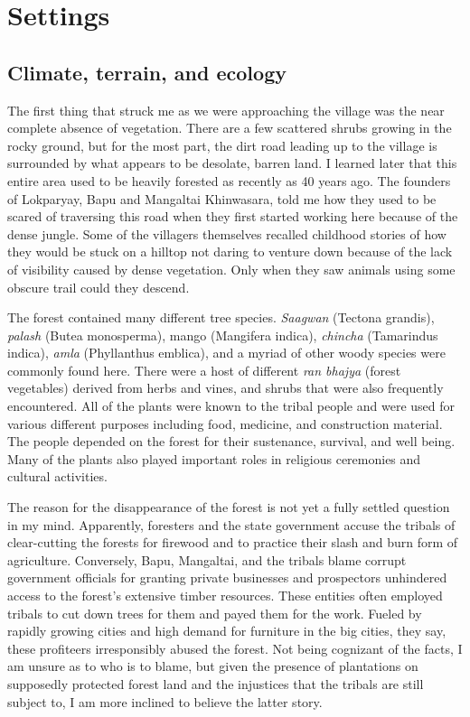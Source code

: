 \documentclass{report}
\begin{document}
\tableofcontents

\chapter{Settings}\label{ch:settings}
\section{Climate, terrain, and ecology}\label{sec:ecology}

The first thing that struck me as we were approaching the village was the near complete absence of vegetation. There are a few scattered shrubs growing in the rocky ground, but for the most part, the dirt road leading up to the village is surrounded by what appears to be desolate, barren land. I learned later that this entire area used to be heavily forested as recently as 40 years ago. The founders of Lokparyay, Bapu and Mangaltai Khinwasara, told me how they used to be scared of traversing this road when they first started working here because of the dense jungle. Some of the villagers themselves recalled childhood stories of how they would be stuck on a hilltop not daring to venture down because of the lack of visibility caused by dense vegetation. Only when they saw animals using some obscure trail could they descend.

The forest contained many different tree species. \textit{Saagwan} (Tectona grandis), \textit{palash} (Butea monosperma), mango (Mangifera indica), \textit{chincha} (Tamarin\-dus indica), \textit{amla} (Phyllanthus emblica), and a myriad of other woody species were commonly found here. There were a host of different \textit{ran bhajya} (forest vegetables) derived from herbs and vines, and shrubs that were also frequently encountered. All of the plants were known to the tribal people and were used for various different purposes including food, medicine, and construction material. The people depended on the forest for their sustenance, survival, and well being. Many of the plants also played important roles in religious ceremonies and cultural activities.

The reason for the disappearance of the forest is not yet a fully settled question in my mind. Apparently, foresters and the state government accuse the tribals of clear-cutting the forests for firewood and to practice their slash and burn form of agriculture. Conversely, Bapu, Mangaltai, and the tribals blame corrupt government officials for granting private businesses and prospectors unhindered access to the forest's extensive timber resources. These entities often employed tribals to cut down trees for them and payed them for the work. Fueled by rapidly growing cities and high demand for furniture in the big cities, they say, these profiteers irresponsibly abused the forest. Not being cognizant of the facts, I am unsure as to who is to blame, but given the presence of plantations on supposedly protected forest land and the injustices that the tribals are still subject to, I am more inclined to believe the latter story.
\end{document}
